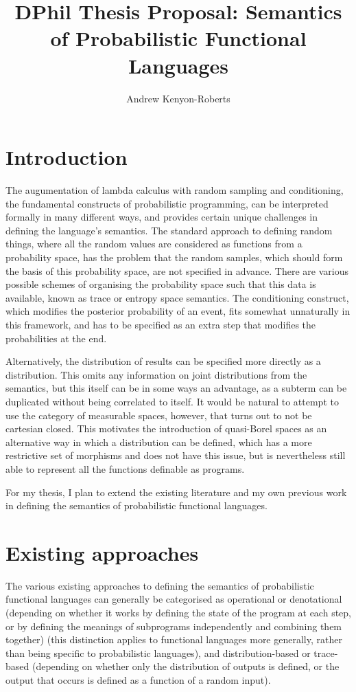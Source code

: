 \documentclass[titlepage]{article}
\title{DPhil Thesis Proposal: Semantics of Probabilistic Functional Languages}
\author{Andrew Kenyon-Roberts}
\begin{document}
\maketitle
\section{Introduction}
The augumentation of lambda calculus with random sampling and conditioning, the fundamental constructs of probabilistic programming, can be interpreted formally in many different ways, and provides certain unique challenges in defining the language's semantics. The standard approach to defining random things, where all the random values are considered as functions from a probability space, has the problem that the random samples, which should form the basis of this probability space, are not specified in advance. There are various possible schemes of organising the probability space such that this data is available, known as trace or entropy space semantics. The conditioning construct, which modifies the posterior probability of an event, fits somewhat unnaturally in this framework, and has to be specified as an extra step that modifies the probabilities at the end.

Alternatively, the distribution of results can be specified more directly as a distribution. This omits any information on joint distributions from the semantics, but this itself can be in some ways an advantage, as a subterm can be duplicated without being correlated to itself. It would be natural to attempt to use the category of measurable spaces, however, that turns out to not be cartesian closed. This motivates the introduction of quasi-Borel spaces as an alternative way in which a distribution can be defined, which has a more restrictive set of morphisms and does not have this issue, but is nevertheless still able to represent all the functions definable as programs.

For my thesis, I plan to extend the existing literature and my own previous work in defining the semantics of probabilistic functional languages.


\section{Existing approaches}
The various existing approaches to defining the semantics of probabilistic functional languages can generally be categorised as operational or denotational (depending on whether it works by defining the state of the program at each step, or by defining the meanings of subprograms independently and combining them together) (this distinction applies to functional languages more generally, rather than being specific to probabilistic languages), and distribution-based or trace-based (depending on whether only the distribution of outputs is defined, or the output that occurs is defined as a function of a random input).
\end{document}
